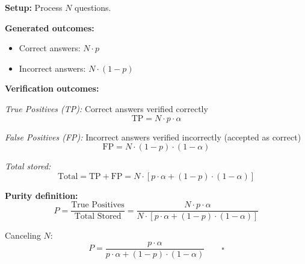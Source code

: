 \documentclass[12pt,a4paper]{article}
\theoremstyle{definition}
\begin{document}
\begin{proofbox}
\textbf{Setup:} Process $N$ questions.

\textbf{Generated outcomes:}
\begin{itemize}
    \item Correct answers: $N \cdot p$
    \item Incorrect answers: $N \cdot (1-p)$
\end{itemize}

\textbf{Verification outcomes:}

\textit{True Positives (TP):} Correct answers verified correctly
\begin{equation}
\text{TP} = N \cdot p \cdot \alpha
\end{equation}

\textit{False Positives (FP):} Incorrect answers verified incorrectly (accepted as correct)
\begin{equation}
\text{FP} = N \cdot (1-p) \cdot (1-\alpha)
\end{equation}

\textit{Total stored:} 
\begin{equation}
\text{Total} = \text{TP} + \text{FP} = N \cdot [p \cdot \alpha + (1-p) \cdot (1-\alpha)]
\end{equation}

\textbf{Purity definition:}
\begin{equation}
P = \frac{\text{True Positives}}{\text{Total Stored}} = \frac{N \cdot p \cdot \alpha}{N \cdot [p \cdot \alpha + (1-p) \cdot (1-\alpha)]}
\end{equation}

Canceling $N$:
\begin{equation}
P = \frac{p \cdot \alpha}{p \cdot \alpha + (1-p) \cdot (1-\alpha)} \qquad \square
\end{equation}
\end{proofbox}
\end{document}
